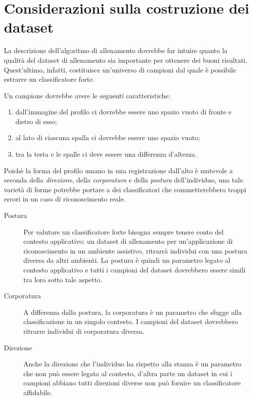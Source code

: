 \documentclass[a4paper,11pt,oneside]{article}
\begin{document}


	\section{Considerazioni sulla costruzione dei dataset} %
	\label{sec:considerazioni_sulla_costruzione_dei_dataset}

		La descrizione dell'algoritmo di allenamento dovrebbe far intuire quanto la qualità del dataset di allenamento sia importante per ottenere dei buoni risultati. Quest'ultimo, infatti, costituisce un'universo di campioni dal quale è possibile estrarre un classificatore forte.

		Un campione dovrebbe avere le seguenti caratteristiche:
		\begin{enumerate}
			\item dall'immagine del profilo ci dovrebbe essere uno spazio vuoto di fronte e dietro di esso;
			\item al lato di ciascuna spalla ci dovrebbe essere uno spazio vuoto;
			\item tra la testa e le spalle ci deve essere una differenza d'altezza.
	 	\end{enumerate}

		Poichè la forma del profilo umano in una registrazione dall'alto è mutevole a seconda della \emph{direzione}, della \emph{corporatura} e della \emph{postura} dell'individuo, una tale varietà di forme potrebbe portare a dei classificatori che commetterebbero troppi errori in un caso di riconoscimento reale.

		\begin{description}
			\item[Postura] Per valutare un classificatore forte bisogna sempre tenere conto del contesto applicativo: un dataset di allenamento per un'applicazione di riconoscimento in un ambiente assistivo, ritrarrà individui con una postura diversa da altri ambienti. La postura è quindi un parametro legato al contesto applicativo e tutti i campioni del dataset dovrebbero essere simili tra loro sotto tale aspetto.

			\item[Corporatura] A differenza dalla postura, la corporatura è un parametro che sfugge alla classificazione in un singolo contesto. I campioni del dataset dovrebbero ritrarre individui di corporatura diversa.

			\item[Direzione] Anche la direzione che l'individuo ha rispetto alla stanza è un parametro che non può essere legato al contesto, d'altra parte un dataset in cui i campioni abbiano tutti direzioni diverse non può fornire un classificatore affidabile.

		\end{description}
\end{document}
